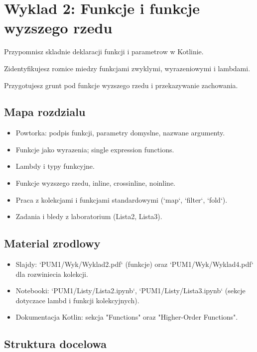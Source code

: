 \chapter{Wyklad 2: Funkcje i funkcje wyzszego rzedu}

\begin{learningobjectives}
  \item Przypomnisz skladnie deklaracji funkcji i parametrow w Kotlinie.
  \item Zidentyfikujesz roznice miedzy funkcjami zwyklymi, wyrazeniowymi i lambdami.
  \item Przygotujesz grunt pod funkcje wyzszego rzedu i przekazywanie zachowania.
\end{learningobjectives}

\section{Mapa rozdzialu}
\begin{itemize}
  \item Powtorka: podpis funkcji, parametry domyslne, nazwane argumenty.
  \item Funkcje jako wyrazenia; single expression functions.
  \item Lambdy i typy funkcyjne.
  \item Funkcje wyzszego rzedu, inline, crossinline, noinline.
  \item Praca z kolekcjami i funkcjami standardowymi (`map`, `filter`, `fold`).
  \item Zadania i bledy z laboratorium (Lista2, Lista3).
\end{itemize}

\section{Material zrodlowy}
\begin{itemize}
  \item Slajdy: `PUM1/Wyk/Wyklad2.pdf` (funkcje) oraz `PUM1/Wyk/Wyklad4.pdf` dla rozwiniecia kolekcji.
  \item Notebooki: `PUM1/Listy/Lista2.ipynb`, `PUM1/Listy/Lista3.ipynb` (sekcje dotyczace lambd i funkcji kolekcyjnych).
  \item Dokumentacja Kotlin: sekcja "Functions" oraz "Higher-Order Functions".
\end{itemize}

\section{Struktura docelowa}
